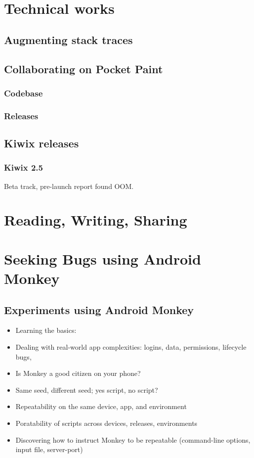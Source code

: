 \section{Technical works}
\subsection{Augmenting stack traces}
\subsection{Collaborating on Pocket Paint}
\subsubsection{Codebase}
\subsubsection{Releases}
\subsection{Kiwix releases}
\subsubsection{Kiwix 2.5}
Beta track, pre-launch report found OOM.
\section{Reading, Writing, Sharing}

\section{Seeking Bugs using Android Monkey}

\subsection{Experiments using Android Monkey}
\begin{itemize}
    \item Learning the basics: 
    \item Dealing with real-world app complexities: logins, data, permissions, lifecycle bugs, 
    \item Is Monkey a good citizen on your phone?
    \item Same seed, different seed; yes script, no script?
    \item Repeatability on the same device, app, and environment
    \item Poratability of scripts across devices, releases, environments
    \item Discovering how to instruct Monkey to be repeatable (command-line options, input file, server-port)
\end{itemize}

